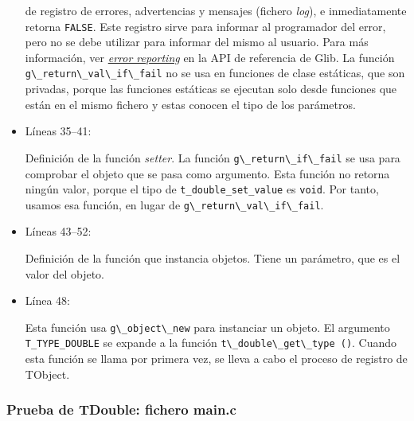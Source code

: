 \begin{itemize}
  de registro de errores, advertencias y mensajes (fichero \textit{log}), e inmediatamente retorna \texttt{FALSE}.
  Este registro sirve para informar al programador del error, pero no se debe utilizar para informar del
  mismo al usuario. Para más información, ver \href{https://docs.gtk.org/glib/error-reporting.html}
  {\emph{\textsf{error reporting}}} en la API de referencia de Glib.
  {\color{red}
  La función \passthrough{\lstinline!g\_return\_val\_if\_fail!} no se usa en funciones de clase estáticas, que son
  privadas, porque las funciones estáticas se ejecutan solo desde funciones que están en el mismo fichero y estas
  conocen el tipo de los parámetros\footnotemark{}.}
\item Líneas 35--41:\par
  Definición de la función \textit{setter}. La función \passthrough{\lstinline!g\_return\_if\_fail!} se usa
  para comprobar el objeto que se pasa como argumento. Esta función no retorna ningún valor, porque
  el tipo de \texttt{t\_double\_set\_value} es \texttt{void}. Por tanto, usamos esa función, en lugar de
  \passthrough{\lstinline!g\_return\_val\_if\_fail!}.
\item Líneas 43--52:\par
  Definición de la función que instancia objetos. Tiene un parámetro, que es el valor del objeto.
\item Línea 48:\par
  Esta función usa \passthrough{\lstinline!g\_object\_new!} para instanciar un objeto. El argumento
  \texttt{T\_TYPE\_DOUBLE} se expande a la función \passthrough{\lstinline!t\_double\_get\_type ()!}.
  Cuando esta función se llama por primera vez, se lleva a cabo el proceso de registro de \textsf{TObject}.
\end{itemize}

\subsubsection{Prueba de \textsf{TDouble}: fichero \textsf{main.c}}

